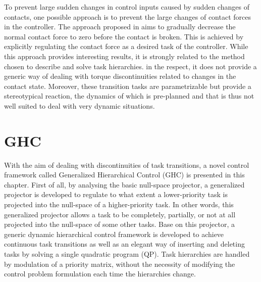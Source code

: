 To prevent large sudden changes in control inputs caused by sudden changes of contacts, one possible approach is to prevent the large changes of contact forces in the controller. The approach proposed in \cite{salini2011} aims to gradually decrease the normal contact force to zero before the contact is broken. This is achieved by explicitly regulating the contact force as a desired task of the controller. While this approach provides interesting results, it is strongly related to the method chosen to describe and solve task hierarchies. in the respect, it does not provide a generic way of dealing with torque discontinuities related to changes in the contact state. Moreover, these transition tasks are parametrizable but provide a stereotypical reaction, the dynamics of which is pre-planned and that is thus not well suited to deal with very dynamic situations.

\section{GHC}
With the aim of dealing with discontinuities of task transitions, a novel control framework called Generalized Hierarchical Control (GHC) is presented in this chapter. First of all, by analysing the basic null-space projector, a generalized projector is developed to regulate to what extent a lower-priority task is projected into the null-space of a higher-priority task. In other words, this generalized projector allows a task to be completely, partially, or not at all projected into the null-space of some other tasks. Base on this projector, a generic dynamic hierarchical control framework is developed to achieve continuous task transitions as well as an elegant way of inserting and deleting tasks by solving a single quadratic program (QP). Task hierarchies are handled by modulation of a priority matrix, without the necessity of modifying the control problem formulation each time the hierarchies change. 


